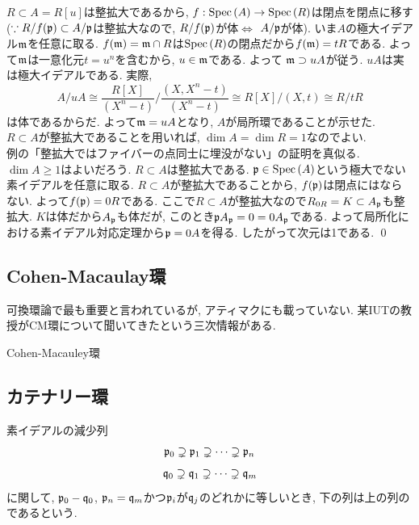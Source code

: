 \begin{egans}
 $R\subset A = R[u]$は整拡大であるから, $f:\mathrm{Spec}\left( A \right)\to \mathrm{Spec}\left( R \right)$は閉点を閉点に移す($\because R/f(\mathfrak{p})\subset A/\mathfrak{p}$は整拡大なので, $R/f(\mathfrak{p})$が体$\iff$ $A/\mathfrak{p}$が体). いま$A$の極大イデアル$\mathfrak{m}$を任意に取る. $f(\mathfrak{m}) = \mathfrak{m}\cap R$は$\mathrm{Spec}\left( R \right)$の閉点だから$f(\mathfrak{m}) = tR$である.  よって$\mathfrak{m}$は一意化元$t = u^n$を含むから, $u\in \mathfrak{m}$である. よって $\mathfrak{m} \supset uA$が従う. $uA$は実は極大イデアルである. 実際,
\[A/uA \cong \dfrac{R[X]}{(X^n-t)} / \dfrac{(X,X^n-t)}{(X^n-t)} \cong R[X]/(X,t) \cong R/tR\]
は体であるからだ. よって$\mathfrak{m} = uA$となり, $A$が局所環であることが示せた. \\
 $R\subset A$が整拡大であることを用いれば, $\dim{A} = \dim{R} = 1$なのでよい.\\
 例の「整拡大ではファイバーの点同士に埋没がない」の証明を真似る. $\dim{A} \geq 1$はよいだろう. $R\subset A$は整拡大である. $\mathfrak{p}\in\mathrm{Spec}\left( A \right)$という極大でない素イデアルを任意に取る. $R\subset A$が整拡大であることから, $f(\mathfrak{p})$は閉点にはならない. よって$f(\mathfrak{p}) = 0R$である. ここで$R\subset A$が整拡大なので$R_{0R} = K\subset A_{\mathfrak{p}}$も整拡大. $K$は体だから$A_{\mathfrak{p}}$も体だが, このとき$\mathfrak{p}A_{\mathfrak{p}} = 0 = 0A_{\mathfrak{p}}$である. よって局所化における素イデアル対応定理から$\mathfrak{p} = 0A$を得る. したがって次元は1である. \qed

\end{egans}


\subsection{Cohen-Macaulay環}
可換環論で最も重要と言われているが, アティマクにも載っていない. 某IUTの教授がCM環について聞いてきたという三次情報がある.

\begin{defn}
Cohen-Macauley環
\end{defn}







\subsection{カテナリー環}
素イデアルの減少列
\[\mathfrak{p}_0\supsetneq \mathfrak{p}_1\supsetneq \dots \supsetneq \mathfrak{p}_n\]
\[\mathfrak{q}_{0} \supsetneq \mathfrak{q}_1\supsetneq  \dots \supsetneq \mathfrak{q}_m\]
に関して, $\mathfrak{p}_0 - \mathfrak{q}_0$, $\mathfrak{p}_n = \mathfrak{q}_m$かつ$\mathfrak{p}_i$が$\mathfrak{q}_j$のどれかに等しいとき, 下の列は上の列のであるという.

